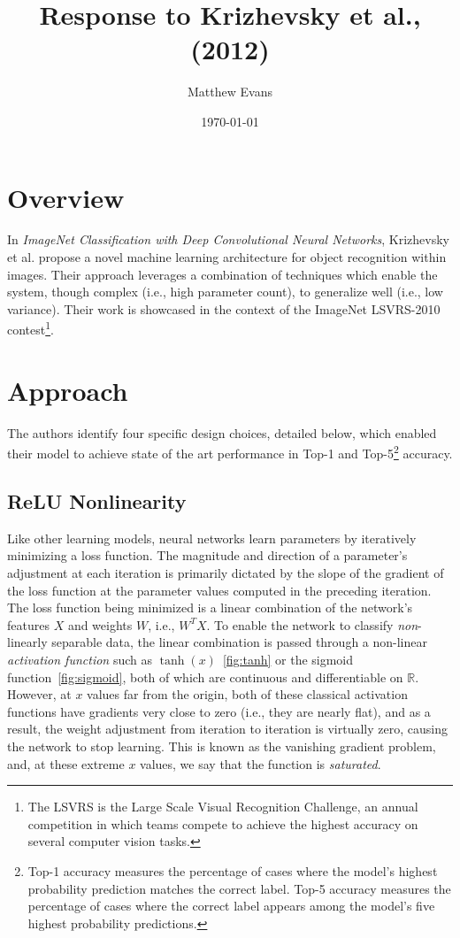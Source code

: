 \documentclass[10pt]{article}
\title{
    Response to Krizhevsky et al., (2012) \\
}
\author{Matthew Evans}
\date{\today}
\begin{document}
\maketitle

\section*{Overview}
In \textit{ImageNet Classification with Deep Convolutional Neural Networks}, Krizhevsky et al.\cite{NIPS2012_c399862d} propose a novel machine learning architecture for object recognition within images. Their approach leverages a combination of techniques which enable the system, though complex (i.e., high parameter count), to generalize well (i.e., low variance). Their work is showcased in the context of the ImageNet LSVRS-2010 contest\footnote{The LSVRS is the Large Scale Visual Recognition Challenge, an annual competition in which teams compete to achieve the highest accuracy on several computer vision tasks.}.

\section*{Approach}
The authors identify four specific design choices, detailed below, which enabled their model to achieve state of the art performance in Top-1 and Top-5\footnote{Top-1 accuracy measures the percentage of cases where the model's highest probability prediction matches the correct label. Top-5 accuracy measures the percentage of cases where the correct label appears among the model's five highest probability predictions.} accuracy.

\subsection*{ReLU Nonlinearity}
Like other learning models, neural networks learn parameters by iteratively minimizing a loss function. The magnitude and direction of a parameter's adjustment at each iteration is primarily dictated by the slope of the gradient of the loss function at the parameter values computed in the preceding iteration. The loss function being minimized is a linear combination of the network's features \(X\) and weights \(W\), i.e., \(W^TX\). To enable the network to classify \textit{non}-linearly separable data, the linear combination is passed through a non-linear \textit{activation function} such as \(\tanh(x)\)~\ref{fig:tanh} or the sigmoid function~\ref{fig:sigmoid}, both of which are continuous and differentiable on \(\mathbb{R}\). However, at \(x\) values far from the origin, both of these classical activation functions have gradients very close to zero (i.e., they are nearly flat), and as a result, the weight adjustment from iteration to iteration is virtually zero, causing the network to stop learning. This is known as the vanishing gradient problem, and, at these extreme \(x\) values, we say that the function is \textit{saturated}.
\end{document}
